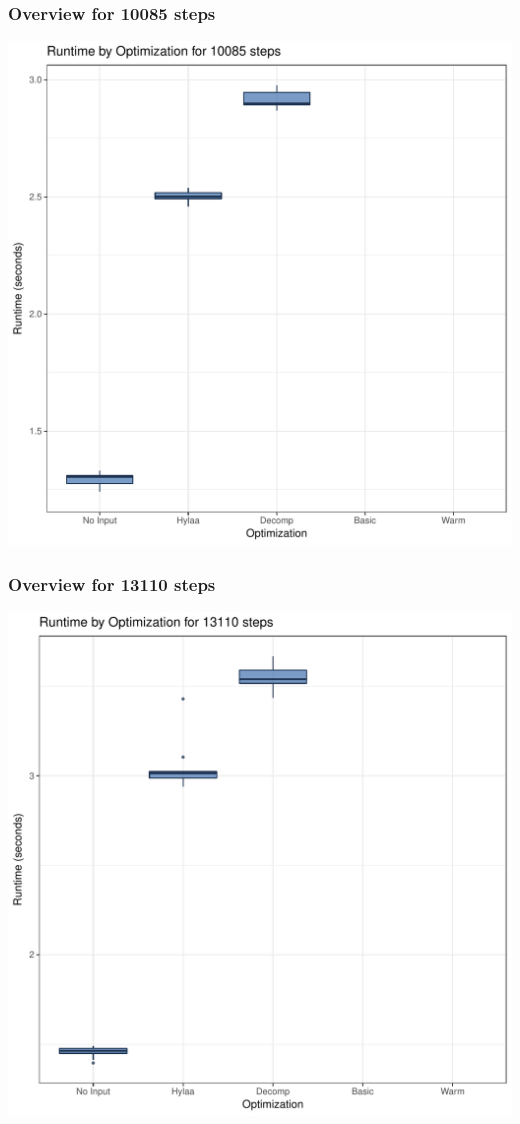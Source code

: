 \documentclass{article}\usepackage[]{graphicx}\usepackage[]{color}
\makeatletter
\def\maxwidth{ %
  \ifdim\Gin@nat@width>\linewidth
    \linewidth
  \else
    \Gin@nat@width
  \fi
}
\newenvironment{knitrout}{}{} %
\makeatother
\begin{document}
\subsubsection{Overview for 10085 steps}
\begin{knitrout}
\color{fgcolor}
\includegraphics[width=\maxwidth]{figure/steps10085-1} 

\end{knitrout}
\subsubsection{Overview for 13110 steps}
\begin{knitrout}
\color{fgcolor}
\includegraphics[width=\maxwidth]{figure/steps13110-1} 

\end{knitrout}
\end{document}
